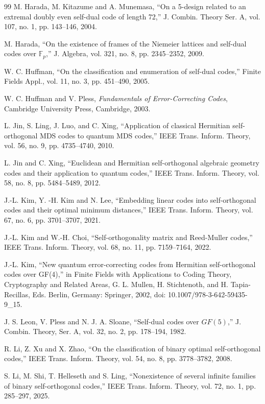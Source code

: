 \documentclass{article}
\theoremstyle{definition}
\theoremstyle{remark}
\begin{document}
\begin{thebibliography}{99}
 M. Harada, M. Kitazume and A. Munemasa, “On a 5-design related to an extremal doubly even self-dual code of length 72,” J. Combin. Theory Ser. A, vol. 107, no. 1, pp. 143--146, 2004.

 M. Harada, “On the existence of frames of the Niemeier lattices and self-dual codes over $\mathbb{F}_p$,” J. Algebra, vol. 321, no. 8, pp. 2345--2352, 2009.

 W. C. Huffman, “On the classification and enumeration of self-dual codes,” Finite Fields Appl., vol. 11, no. 3, pp. 451--490, 2005.

 W. C. Huffman and V. Pless, {\it Fundamentals of Error-Correcting Codes}, Cambridge University Press, Cambridge, 2003.

 L. Jin, S. Ling, J. Luo, and C. Xing, “Application of classical Hermitian self-orthogonal MDS codes to quantum MDS codes,” IEEE Trans. Inform. Theory, vol. 56, no. 9, pp. 4735--4740, 2010.
	
 L. Jin and C. Xing, “Euclidean and Hermitian self-orthogonal algebraic geometry codes and their application to quantum codes,” IEEE Trans. Inform. Theory, vol. 58, no. 8, pp. 5484--5489, 2012.

 J.-L. Kim, Y. -H. Kim and N. Lee, “Embedding linear codes into self-orthogonal codes and their optimal minimum distances,” IEEE Trans. Inform. Theory, vol. 67, no. 6, pp. 3701--3707, 2021.

 J.-L. Kim and W.-H. Choi, “Self-orthogonality matrix and Reed-Muller codes,” IEEE Trans. Inform. Theory, vol. 68, no. 11, pp. 7159--7164, 2022.

 J.-L. Kim, “New quantum error-correcting codes from Hermitian self-orthogonal codes over GF(4),” in Finite Fields with Applications to Coding Theory, Cryptography and Related Areas, G. L. Mullen, H. Stichtenoth, and H. Tapia-Recillas, Eds. Berlin, Germany: Springer, 2002, doi: 10.1007/978-3-642-59435-9\_15.
	
 J. S. Leon, V. Pless and N. J. A. Sloane, “Self-dual codes over $GF(5)$,” J. Combin. Theory, Ser. A, vol. 32, no. 2, pp. 178--194, 1982.

 R. Li, Z. Xu and X. Zhao, “On the classification of binary optimal self-orthogonal codes,” IEEE Trans. Inform. Theory, vol. 54, no. 8, pp. 3778--3782, 2008.

 S. Li, M. Shi, T. Helleseth and S. Ling, “Nonexistence of several infinite families of binary self-orthogonal codes,” IEEE Trans. Inform. Theory, vol. 72, no. 1, pp. 285--297, 2025.


\end{thebibliography}
\end{document}
